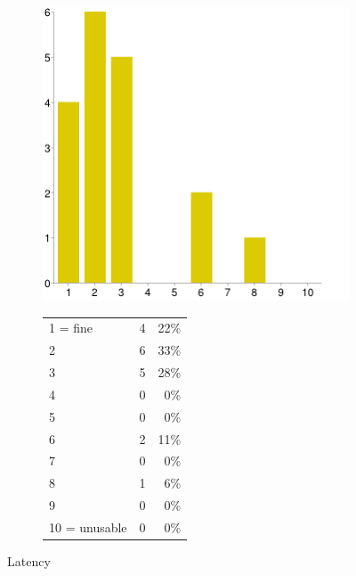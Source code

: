 \documentclass[MSc,paper=a4,pagesize=auto]{icldt}
\begin{document}
\begin{figure}[htbp!]
\centering
\begin{subfigure}{0.4\textwidth}
    \centering
    \includegraphics[width=1\linewidth]{resources/10-latency}
\end{subfigure}%
\centering
\begin{subfigure}{0.5\textwidth}
    \centering
   	\begin{tabular}{ l c r }
1 = fine&4&22\% \\
2&6&33\% \\
3&5&28\% \\
4&0&0\% \\
5&0&0\% \\
6&2&11\% \\
7&0&0\% \\
8&1&6\% \\
9&0&0\% \\
10 = unusable&0&0\% \\
\end{tabular}
\end{subfigure} 
    \caption{Latency}
    \label{fig:10-latency}
\end{figure}
\end{document}
